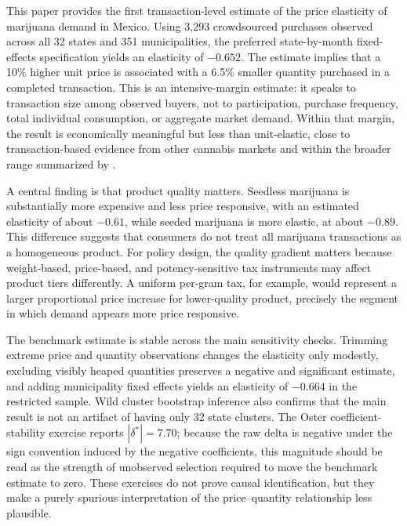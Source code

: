 
This paper provides the first transaction-level estimate of the price elasticity of marijuana demand in Mexico.  Using 3{,}293 crowdsourced purchases observed across all 32 states and 351 municipalities, the preferred state-by-month fixed-effects specification yields an elasticity of $-0.652$.  The estimate implies that a 10\% higher unit price is associated with a 6.5\% smaller quantity purchased in a completed transaction.  This is an intensive-margin estimate: it speaks to transaction size among observed buyers, not to participation, purchase frequency, total individual consumption, or aggregate market demand.  Within that margin, the result is economically meaningful but less than unit-elastic, close to transaction-based evidence from other cannabis markets \citep{davis2016crowd,halcoussis2017geo,riley2020southafrica} and within the broader range summarized by \citet{gallet2014monkey}.

A central finding is that product quality matters.  Seedless marijuana is substantially more expensive and less price responsive, with an estimated elasticity of about $-0.61$, while seeded marijuana is more elastic, at about $-0.89$.  This difference suggests that consumers do not treat all marijuana transactions as a homogeneous product.  For policy design, the quality gradient matters because weight-based, price-based, and potency-sensitive tax instruments may affect product tiers differently.  A uniform per-gram tax, for example, would represent a larger proportional price increase for lower-quality product, precisely the segment in which demand appears more price responsive.

The benchmark estimate is stable across the main sensitivity checks.  Trimming extreme price and quantity observations changes the elasticity only modestly, excluding visibly heaped quantities preserves a negative and significant estimate, and adding municipality fixed effects yields an elasticity of $-0.664$ in the restricted sample.  Wild cluster bootstrap inference also confirms that the main result is not an artifact of having only 32 state clusters.  The Oster coefficient-stability exercise reports $|\delta^{*}|=7.70$; because the raw delta is negative under the sign convention induced by the negative coefficients, this magnitude should be read as the strength of unobserved selection required to move the benchmark estimate to zero.  These exercises do not prove causal identification, but they make a purely spurious interpretation of the price--quantity relationship less plausible.

